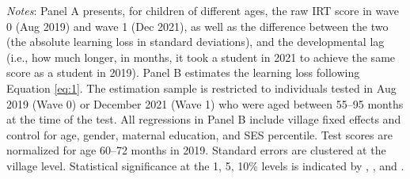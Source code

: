 \begin{table}[H]
\begin{minipage}{1\linewidth}
\footnotesize
\textit{Notes}: Panel A presents, for children of different ages, the raw IRT score in wave 0 (Aug 2019) and wave 1 (Dec 2021), as well as the difference between the two (the absolute learning loss in standard deviations), and the developmental lag (i.e., how much longer, in months, it took a student in 2021 to achieve the same score as a student in 2019). Panel B estimates the learning loss following Equation \ref{eq:1}. The estimation sample is restricted to individuals tested in Aug 2019 (Wave 0) or December 2021 (Wave 1) who were aged between 55--95 months at the time of the test. All regressions in Panel B include village fixed effects and control for age, gender, maternal education, and SES percentile. Test scores are normalized for age 60--72 months in 2019. Standard errors are clustered at the village level. Statistical significance at the 1, 5, 10\% levels is indicated by \sym{***}, \sym{**}, and \sym{*}.
\end{minipage}
\end{table}
\endgroup